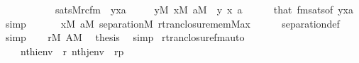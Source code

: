 \begin{isabellebody}
\ \ \ \ \ \ \ \ \ \ {\isasymlongleftrightarrow}\ sats{\isacharparenleft}{\kern0pt}M{\isacharcomma}{\kern0pt}rcfm{\isacharparenleft}{\kern0pt}{}{\isacharcomma}{\kern0pt}{}{\isacharcomma}{\kern0pt}{}{\isacharparenright}{\kern0pt}\ {\isacharcomma}{\kern0pt}\ {\isacharbrackleft}{\kern0pt}y{\isacharcomma}{\kern0pt}x{\isacharcomma}{\kern0pt}a{\isacharbrackright}{\kern0pt}{\isacharparenright}{\kern0pt}{\isachardoublequoteclose}\isanewline
\ \ \ \ \ {\isachardoublequoteopen}y{\isasymin}M{\isachardoublequoteclose}\ {\isachardoublequoteopen}x{\isasymin}M{\isachardoublequoteclose}\ {\isachardoublequoteopen}a{\isasymin}M{\isachardoublequoteclose}\ \ y\ x\ a\isanewline
\ \ \ \ \isamarkupfalse%
\ that\ fmsats{\isacharbrackleft}{\kern0pt}of\ {\isachardoublequoteopen}{\isacharbrackleft}{\kern0pt}y{\isacharcomma}{\kern0pt}x{\isacharcomma}{\kern0pt}a{\isacharbrackright}{\kern0pt}{\isachardoublequoteclose}{\isacharbrackright}{\kern0pt}\ \isamarkupfalse%
\ simp\isanewline
\ \ \isamarkupfalse%
\isanewline
\ \ \isamarkupfalse%
\ {\isachardoublequoteopen}{\isasymforall}x{\isasymin}M{\isachardot}{\kern0pt}\ {\isasymforall}a{\isasymin}M{\isachardot}{\kern0pt}\ separation{\isacharparenleft}{\kern0pt}{\isacharhash}{\kern0pt}{\isacharhash}{\kern0pt}M{\isacharcomma}{\kern0pt}\ rtran{\isacharunderscore}{\kern0pt}closure{\isacharunderscore}{\kern0pt}mem{\isacharparenleft}{\kern0pt}{\isacharhash}{\kern0pt}{\isacharhash}{\kern0pt}M{\isacharcomma}{\kern0pt}a{\isacharcomma}{\kern0pt}x{\isacharparenright}{\kern0pt}{\isacharparenright}{\kern0pt}{\isachardoublequoteclose}\isanewline
\ \ \ \ \isamarkupfalse%
\ separation{\isacharunderscore}{\kern0pt}def\ \isamarkupfalse%
\ simp\isanewline
\ \ \isamarkupfalse%
\ {\isacartoucheopen}r{\isasymin}M{\isacartoucheclose}\ {\isacartoucheopen}A{\isasymin}M{\isacartoucheclose}\ \isamarkupfalse%
\ {\isacharquery}{\kern0pt}thesis\ \isamarkupfalse%
\ simp\isanewline
{}\isamarkupfalse%
%
\endisatagproof
{\isafoldproof}%
%
\isadelimproof
\isanewline
%
\endisadelimproof
\isanewline
{}\isamarkupfalse%
\ rtran{\isacharunderscore}{\kern0pt}closure{\isacharunderscore}{\kern0pt}fm{\isacharunderscore}{\kern0pt}auto{\isacharcolon}{\kern0pt}\isanewline
\ \ \isanewline
\ \ \ \ {\isachardoublequoteopen}nth{\isacharparenleft}{\kern0pt}i{\isacharcomma}{\kern0pt}env{\isacharparenright}{\kern0pt}\ {\isacharequal}{\kern0pt}\ r{\isachardoublequoteclose}\ {\isachardoublequoteopen}nth{\isacharparenleft}{\kern0pt}j{\isacharcomma}{\kern0pt}env{\isacharparenright}{\kern0pt}\ {\isacharequal}{\kern0pt}\ rp{\isachardoublequoteclose}\isanewline

\end{isabellebody}
